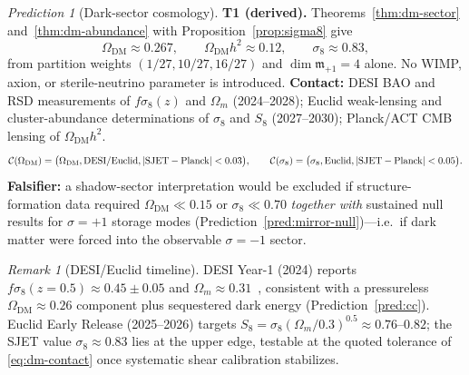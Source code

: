 \documentclass[aps,prd,onecolumn,amsmath,amssymb,nofootinbib,11pt]{revtex4-2}
\numberwithin{equation}{section}
\theoremstyle{plain}
\theoremstyle{definition}
\theoremstyle{remark}
\newtheorem{remark}[theorem]{Remark}
\newtheorem{prediction}[theorem]{Prediction}
\begin{document}
\begin{prediction}[Dark-sector cosmology]\label{pred:dm}
\textbf{T1 (derived).} Theorems~\ref{thm:dm-sector} and~\ref{thm:dm-abundance}
with Proposition~\ref{prop:sigma8} give
\begin{equation}\label{eq:pred-dm}
  \Omega_{\mathrm{DM}}\approx 0.267,
  \qquad
  \Omega_{\mathrm{DM}}h^2\approx 0.12,
  \qquad
  \sigma_8\approx 0.83,
\end{equation}
from partition weights $(1/27,10/27,16/27)$ and $\dim\mathfrak{m}_{+1}=4$ alone.
No WIMP, axion, or sterile-neutrino parameter is introduced.
\textbf{Contact:} DESI BAO and RSD measurements of
$f\sigma_8(z)$ and $\Omega_m$ (2024--2028); Euclid weak-lensing and
cluster-abundance determinations of $\sigma_8$ and $S_8$ (2027--2030);
Planck/ACT CMB lensing of $\Omega_{\mathrm{DM}}h^2$.
\begin{equation}\label{eq:dm-contact}
  \mathcal{C}(\Omega_{\mathrm{DM}})
  =\bigl(\Omega_{\mathrm{DM}},\mathrm{DESI/Euclid},|{\rm SJET}-{\rm Planck}|<0.03\bigr),
  \qquad
  \mathcal{C}(\sigma_8)
  =\bigl(\sigma_8,\mathrm{Euclid},|{\rm SJET}-{\rm Planck}|<0.05\bigr).
\end{equation}
\textbf{Falsifier:} a shadow-sector interpretation would be excluded if
structure-formation data required $\Omega_{\mathrm{DM}}\ll 0.15$ or
$\sigma_8\ll 0.70$ \emph{together with} sustained null results for
$\sigma=+1$ storage modes (Prediction~\ref{pred:mirror-null})---i.e.\ if dark
matter were forced into the observable $\sigma=-1$ sector.
\end{prediction}

\begin{remark}[DESI/Euclid timeline]
DESI Year-1 (2024) reports $f\sigma_8(z=0.5)\approx 0.45\pm0.05$ and
$\Omega_m\approx 0.31$~\cite{DESI2024}, consistent with a pressureless
$\Omega_{\mathrm{DM}}\approx 0.26$ component plus sequestered dark energy
(Prediction~\ref{pred:cc}). Euclid Early Release (2025--2026) targets
$S_8=\sigma_8(\Omega_m/0.3)^{0.5}\approx 0.76$--$0.82$; the SJET value
$\sigma_8\approx 0.83$ lies at the upper edge, testable at the quoted
tolerance of \eqref{eq:dm-contact} once systematic shear calibration
stabilizes.
\end{remark}
\end{document}
